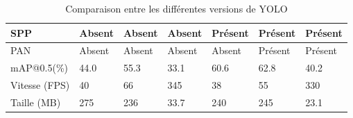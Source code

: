 \begin{itemize}
\begin{table}[H]
\begin{tabular}{|l|l|l|l|l|l|l|}
                    SPP & Absent & Absent & Absent & Présent & Présent & Présent \\ \hline
                    PAN & Absent & Absent & Absent & Absent & Présent & Présent \\ \hline
                    mAP@0.5(\%) & 44.0 & 55.3 & 33.1 & 60.6 & 62.8 & 40.2 \\ \hline
                    Vitesse (FPS) & 40 & 66 & 345 & 38 & 55 & 330 \\ \hline
                    Taille (MB) & 275 & 236 & 33.7 & 240 & 245 & 23.1 \\ \hline
                \end{tabular}
                \caption{Comparaison entre les différentes versions de YOLO}
            \end{table}
            
        \end{itemize}
